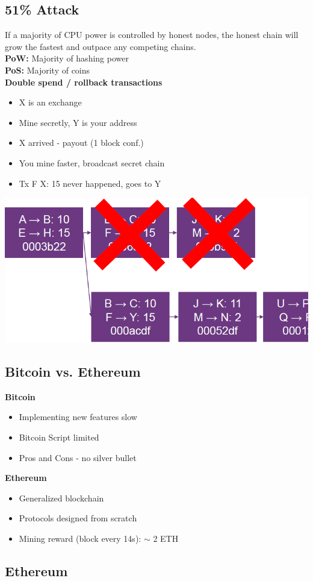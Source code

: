 \subsection{51\% Attack}
If a majority of CPU power is controlled by honest nodes, the honest chain will grow the fastest and outpace any competing chains.\\
\textbf{PoW:} Majority of hashing power\\
\textbf{PoS:} Majority of coins\\
\textbf{Double spend / rollback transactions}
\begin{itemize}
    \item X is an exchange
    \item Mine secretly, Y is your address
    \item X arrived - payout (1 block conf.)
    \item You mine faster, broadcast secret chain
    \item Tx F \textrightarrow X: 15 never happened, goes to Y
\end{itemize}
\includegraphics[width=0.6\linewidth]{../img/51_percent_attack.png}

\subsection{Bitcoin vs. Ethereum}
\textbf{Bitcoin}
\begin{itemize}
    \item Implementing new features slow
    \item Bitcoin Script limited
    \item Pros and Cons - no silver bullet
\end{itemize}
\textbf{Ethereum}
\begin{itemize}
    \item Generalized blockchain
    \item Protocols designed from scratch
    \item Mining reward (block every 14s): $\sim$ 2 ETH
\end{itemize}

\subsection{Ethereum}
